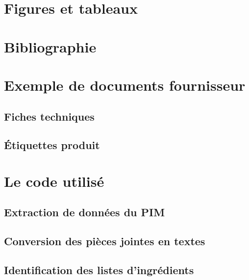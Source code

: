 \documentclass{report}
\begin{document}
\appendix
\part{Figures et tableaux}
    \listoftables
    \listoffigures
\part{Bibliographie}
    
    
\part{Exemple de documents fournisseur}
    \chapter{Fiches techniques}
    \chapter{\'{E}tiquettes produit}
\part{Le code utilisé}
    \chapter{Extraction de données du PIM}
    \chapter{Conversion des pièces jointes en textes}
    \chapter{Identification des listes d'ingrédients}
\end{document}
